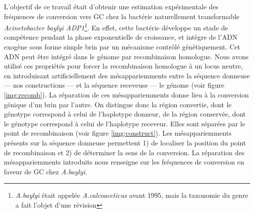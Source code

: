 L'objectif de ce travail était d'obtenir une estimation expérimentale des
fréquences de conversion vers GC chez la bactérie naturellement transformable
\emph{Acinetobacter baylyi ADP1}\footnote{\emph{A.baylyi} était appelée
  \emph{A.calcoaceticus} avant 1995, mais la taxonomie du genre a fait l'objet
  d'une révision\cite{euzeby_list_1997}}. En effet, cette bactérie développe un
stade de compétence pendant la phase exponentielle de croissance, et intègre de
l'ADN exogène sous forme simple brin\cite{chen_dna_2004} par un mécanisme
contrôlé génétiquement. Cet ADN peut être intégré dans le génome par
recombinaison homologue. Nous avons utilisé ces propriétés pour forcer la
recombinaison homologue à un locus neutre, en introduisant artificiellement des
mésappariemments entre la séquence donneuse --- nos constructions --- et la
séquence receveuse --- le génome (voir figure \ref{img:recomb}). La réparation
de ces mésappariemments donne lieu à la conversion génique d'un brin par
l'autre. On distingue donc la région convertie, dont le génotype correspond à
celui de l'haplotype donneur, de la région conservée, dont le génotype
correspond à celui de l'haplotype receveur. Elles sont séparées par le point de
recombinaison (voir figure \ref{img:construct}). Les mésappariemments présents
sur la séquence donneuse permettent 1) de localiser la position du point de
recombinaison et 2) de déterminer la sens de la conversion. La réparation des
mésappariemments introduits nous renseigne sur les fréquences de conversion en
faveur de GC chez \emph{A.baylyi}.


\newpage
